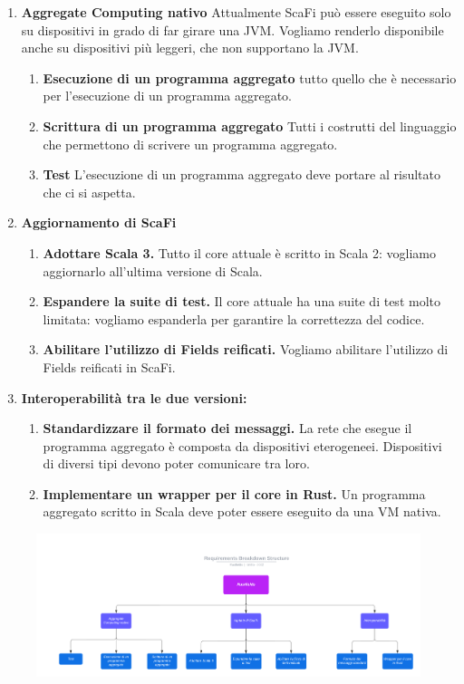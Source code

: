 \documentclass[12pt, a4paper]{article}
\begin{document}
\begin{enumerate}
    \item \textbf{Aggregate Computing nativo} Attualmente ScaFi può essere eseguito solo su dispositivi in grado di 
    far girare una JVM. Vogliamo renderlo disponibile anche su dispositivi più leggeri, che non supportano la JVM.
        \begin{enumerate}
            \item \textbf{Esecuzione di un programma aggregato} tutto quello che è necessario per l'esecuzione 
            di un programma aggregato.
            \item \textbf{Scrittura di un programma aggregato} Tutti i costrutti del linguaggio che permettono di 
            scrivere un programma aggregato.
            \item \textbf{Test} L'esecuzione di un programma aggregato deve portare al risultato che ci si aspetta.
        \end{enumerate}

    \item \textbf{Aggiornamento di ScaFi}
        \begin{enumerate}
            \item \textbf{Adottare Scala 3.} Tutto il core attuale è scritto in Scala 2: vogliamo aggiornarlo 
            all'ultima versione di Scala.
            \item \textbf{Espandere la suite di test.} Il core attuale ha una suite di test molto limitata: vogliamo
            espanderla per garantire la correttezza del codice. 
            \item \textbf{Abilitare l'utilizzo di Fields reificati.} Vogliamo abilitare l'utilizzo di Fields reificati
            in ScaFi.
        \end{enumerate}

    \item \textbf{Interoperabilità tra le due versioni:}
        \begin{enumerate}
            \item \textbf{Standardizzare il formato dei messaggi.} La rete che esegue il programma aggregato è composta 
            da dispositivi eterogeneei. Dispositivi di diversi tipi devono poter comunicare tra loro.
            \item \textbf{Implementare un wrapper per il core in Rust.} Un programma aggregato scritto in Scala deve 
            poter essere eseguito da una VM nativa.
        \end{enumerate}
\end{enumerate}

\begin{figure}[h]
    \includegraphics[angle=90, width=\textwidth, height=\textheight]{res/rbs.png}
\end{figure}
\end{document}
